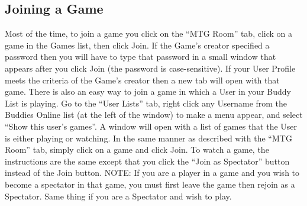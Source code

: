 \documentclass[a4paper]{scrbook}
\begin{document}
\subsection{Joining a Game}
Most of the time, to join a game you click on the “MTG Room” tab, click on a game in the Games list, then click Join. If the Game's creator specified a password then you will have to type that password in a small window that appears after you click Join (the password is case-sensitive). If your User Profile meets the criteria of the Game's creator then a new tab will open with that game. There is also an easy way to join a game in which a User in your Buddy List is playing. Go to the “User Lists” tab, right click any Username from the Buddies Online list (at the left of the window) to make a menu appear, and select “Show this user's games”. A window will open with a list of games that the User is either playing or watching. In the same manner as described with the “MTG Room” tab, simply click on a game and click Join. To watch a game, the instructions are the same except that you click the “Join as Spectator” button instead of the Join button. NOTE: If you are a player in a game and you wish to become a spectator in that game, you must first leave the game then rejoin as a Spectator. Same thing if you are a Spectator and wish to play.
\end{document}
